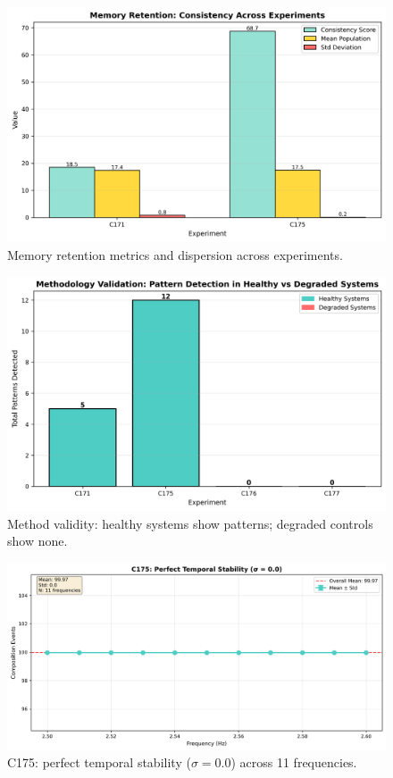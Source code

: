 \documentclass[11pt]{article}
\begin{document}
\begin{figure}[t]
\centering
\includegraphics[width=0.85\linewidth]{figure3_memory_retention_comparison.png}
\caption{Memory retention metrics and dispersion across experiments.}
\end{figure}

\begin{figure}[t]
\centering
\includegraphics[width=0.85\linewidth]{figure4_methodology_validation.png}
\caption{Method validity: healthy systems show patterns; degraded controls show none.}
\end{figure}

\begin{figure}[t]
\centering
\includegraphics[width=0.95\linewidth]{figure6_c175_perfect_stability.png}
\caption{C175: perfect temporal stability ($\sigma=0.0$) across 11 frequencies.}
\end{figure}
\end{document}
